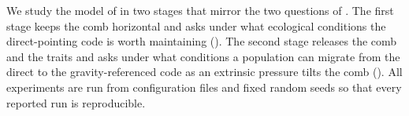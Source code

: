 
We study the model of  in two stages that mirror the two
questions of . The first stage keeps the comb horizontal and asks
under what ecological conditions the direct-pointing code is worth maintaining
(). The second stage releases the comb and the
 traits and asks under what conditions a population can migrate from
the direct to the gravity-referenced code as an extrinsic pressure tilts the comb
(). All experiments are run from configuration files
and fixed random seeds so that every reported run is reproducible.

